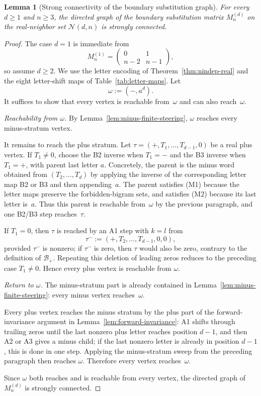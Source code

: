 \documentclass{amsart}
\newtheorem{lemma}[theorem]{Lemma}
\theoremstyle{definition}
\theoremstyle{remark}
\begin{document}
\begin{lemma}[Strong connectivity of the boundary substitution graph]
\label{lem:M-strongly-connected}
For every $d \ge 1$ and $n \ge 3$, the directed graph of the
boundary substitution matrix $M_n^{(d)}$ on the real-neighbor set
$\mathcal{N}(d,n)$ is strongly connected.
\end{lemma}

\begin{proof}
The case $d=1$ is immediate from
\[
  M_n^{(1)}=\begin{pmatrix}0&1\\ n-2&n-1\end{pmatrix},
\]
so assume $d\ge2$.  We use the letter encoding of
Theorem~\ref{thm:nindep-real} and the eight letter-shift maps of
Table~\ref{tab:letter-maps}.  Let
\[
  \omega := (-,a^d).
\]
It suffices to show that every vertex is reachable from~$\omega$
and can also reach~$\omega$.

\smallskip\noindent
\emph{Reachability from $\omega$.}
By Lemma~\ref{lem:minus-finite-steering}, $\omega$ reaches every
minus-stratum vertex.

It remains to reach the plus stratum.  Let
$\tau=(+,T_1,\ldots,T_{d-1},0)$ be a real plus vertex.  If
$T_1\ne0$, choose the B2 inverse when $T_1=-$ and the B3 inverse
when $T_1=+$, with parent last letter $a$.  Concretely,
the parent is the minus word obtained from
$(T_2,\ldots,T_d)$ by applying the inverse of the corresponding
letter map B2 or B3 and then appending~$a$.  The parent satisfies
\textup{(M1)} because the letter maps preserve the forbidden-bigram
sets, and satisfies \textup{(M2)} because its last letter is~$a$.
Thus this parent is reachable from~$\omega$ by the previous
paragraph, and one B2/B3 step reaches~$\tau$.

If $T_1=0$, then $\tau$ is reached by an A1 step with $k=l$ from
\[
  \tau^- := (+,T_2,\ldots,T_{d-1},0,0),
\]
provided $\tau^-$ is nonzero; if $\tau^-$ is zero, then $\tau$
would also be zero, contrary to the definition of $\mathcal{B}_+$.
Repeating this deletion of leading zeros reduces to the preceding
case $T_1\ne0$.  Hence every plus vertex is reachable from
$\omega$.

\smallskip\noindent
\emph{Return to $\omega$.}
The minus-stratum part is already contained in
Lemma~\ref{lem:minus-finite-steering}: every minus vertex
reaches~$\omega$.

Every plus vertex reaches the minus stratum by the plus part of the
forward-invariance argument in
Lemma~\ref{lem:forward-invariance}: A1 shifts through trailing
zeros until the last nonzero plus letter reaches position $d-1$,
and then A2 or A3 gives a minus child; if the last nonzero letter
is already in position $d-1$, this is done in one step.  Applying
the minus-stratum sweep from the preceding paragraph then reaches
$\omega$.  Therefore every vertex reaches~$\omega$.

Since $\omega$ both reaches and is reachable from every vertex, the
directed graph of $M_n^{(d)}$ is strongly connected.
\end{proof}
\end{document}
